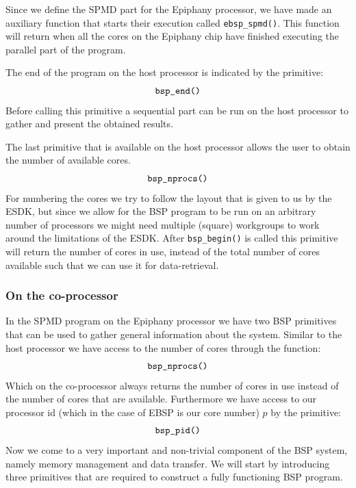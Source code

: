 \documentclass[fleqn]{article}
\renewcommand{\(}{\left(}
\renewcommand{\)}{\right)}
\begin{document}
Since we define the SPMD part for the Epiphany processor, we have made an auxiliary function that starts their execution called \verb.ebsp_spmd().. This function will return when all the cores on the Epiphany chip have finished executing the parallel part of the program. 

The end of the program on the host processor is indicated by the primitive:
\begin{equation}
    \verb.bsp_end(). 
\end{equation}
Before calling this primitive a sequential part can be run on the host processor to gather and present the obtained results.

The last primitive that is available on the host processor allows the user to obtain the number of available cores. 
\begin{equation}
    \verb.bsp_nprocs(). 
\end{equation}
For numbering the cores we try to follow the layout that is given to us by the ESDK, but since we allow for the BSP program to be run on an arbitrary number of processors we might need multiple (square) workgroups to work around the limitations of the ESDK. After \verb.bsp_begin(). is called this primitive will return the number of cores in use, instead of the total number of cores available such that we can use it for data-retrieval.

\subsubsection{On the co-processor}

In the SPMD program on the Epiphany processor we have two BSP primitives that can be used to gather general information about the system. Similar to the host processor we have access to the number of cores through the function:
\begin{equation}
    \verb.bsp_nprocs(). 
\end{equation}
Which on the co-processor always returns the number of cores in use instead of the number of cores that are available. Furthermore we have access to our processor id (which in the case of EBSP is our core number) $p$ by the primitive:
\begin{equation}
    \verb.bsp_pid(). 
\end{equation}
Now we come to a very important and non-trivial component of the BSP system, namely memory management and data transfer. We will start by introducing three primitives that are required to construct a fully functioning BSP program.
\end{document}
